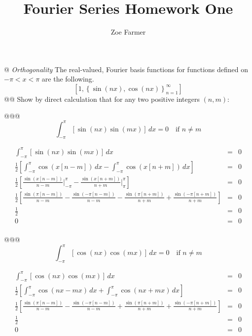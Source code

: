 \documentclass[10pt]{article}
\title{Fourier Series Homework One}
\author{Zoe Farmer}
\begin{document}
\maketitle

\begin{easylist}[enumerate]
    @ \textit{Orthogonality}
        The real-valued, Fourier basis functions for functions defined on $- \pi < x < \pi $ are the following.
        \[
            \left[
                1, {\left\{ \sin(nx), \cos(nx) \right\}}_{n=1}^\infty
            \right]
        \]
    @@ Show by direct calculation that for any two positive integers $(n, m)$:

    @@@ \[ \int_{-\pi}^\pi \left[ \sin(nx) \sin(mx) \right] \, dx = 0 \quad \text{if } n \neq m \]

    \begin{align*}
        \int_{-\pi}^\pi \left[ \sin(nx) \sin(mx) \right] \, dx &=& 0\\
        \frac{1}{2} \left[ \int_{-\pi}^\pi \cos(x [n - m]) \, dx - \int_{-\pi}^\pi \cos(x [n + m]) \, dx \right] &=& 0\\
        \frac{1}{2} \left[ \frac{\sin(x[n - m])}{n - m}\bigg|_{-\pi}^\pi - \frac{\sin(x[n + m])}{n + m} \bigg|_{\pi}^\pi\right] &=& 0\\
        \frac{1}{2} \left[ \frac{\sin(\pi [n - m])}{n - m} - \frac{\sin(-\pi [n - m])}{n - m} -
            \frac{\sin(\pi[n + m])}{n + m} + \frac{\sin(-\pi[n + m])}{n + m}\right] &=& 0\\
        \frac{1}{2} &=&  0\\
        0 &=& 0\\
    \end{align*}

    @@@ \[ \int_{-\pi}^\pi \left[ \cos(nx) \cos(mx) \right] \, dx = 0 \quad \text{if } n \neq m \]

    \begin{align*}
        \int_{-\pi}^\pi \left[ \cos(nx) \cos(mx) \right] \, dx &=& 0\\
        \frac{1}{2} \left[ \int_{-\pi}^\pi \cos(nx - mx) \, dx + \int_{-\pi}^\pi \cos(nx + mx) \, dx \right] &=& 0\\
        \frac{1}{2} \left[ \frac{\sin(\pi [n - m])}{n - m} - \frac{\sin(-\pi [n - m])}{n - m} +
            \frac{\sin(\pi[n + m])}{n + m} + \frac{\sin(-\pi[n + m])}{n + m}\right] &=& 0\\
        \frac{1}{2} &=& 0\\
        0 &=& 0
    \end{align*}


\end{easylist}
\end{document}
